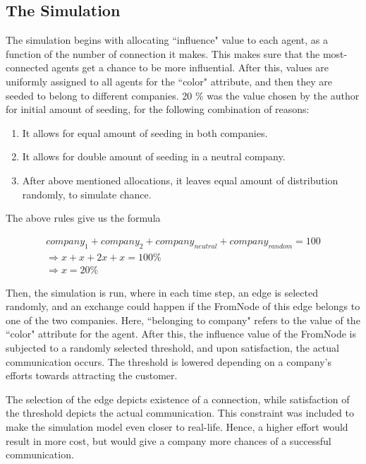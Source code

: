 \subsection{The Simulation} 
 
The simulation begins with allocating ``influence" value to each agent, as a function of the number of connection it makes. This makes sure that the most-connected agents get a chance to be more influential. 
After this, values are uniformly assigned to all agents for the ``color" attribute, and then they are seeded to belong to different companies. 20 \% was the value chosen by the author for initial amount of seeding, for the following combination of reasons:

\begin{enumerate}
\item It allows for equal amount of seeding in both companies.
\item It allows for double amount of seeding in a neutral company.
\item After above mentioned allocations, it leaves equal amount of distribution randomly, to simulate chance.
\end{enumerate}

The above rules give us the formula

\begin{eqnarray}
company_1 + company_2 + company_{neutral} + company_{random} = 100 \nonumber \\
\Rightarrow x + x + 2x + x = 100 \% \nonumber \\
\Rightarrow x = 20 \% 
\label{eqn:seed fraction}
\end{eqnarray}

Then, the simulation is run, where in each time step, an edge is selected randomly, and an exchange could happen if the FromNode of this edge belongs to one of the two companies. Here, ``belonging to company" refers to the value of the ``color" attribute for the agent.
After this, the influence value of the FromNode is subjected to a randomly selected threshold, and upon satisfaction, the actual communication occurs. The threshold is lowered depending on a company's efforts towards attracting the customer. 

The selection of the edge depicts existence of a connection, while satisfaction of the threshold depicts the actual communication. This constraint was included to make the simulation model even closer to real-life. 
Hence, a higher effort would result in more cost, but would give a company more chances of a successful communication.

